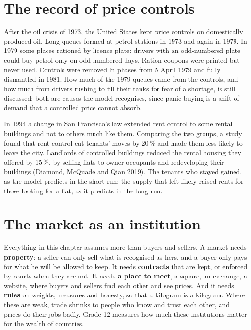 \section{The record of price controls}\label{sec:g10:what-prices-do:record}

\begin{record}
After the oil crisis of 1973, the United States kept price controls on domestically produced oil. Long queues formed at petrol stations in 1973 and again in 1979.
In 1979 some places rationed by licence plate: drivers with an odd-numbered plate could buy petrol only on odd-numbered days. Ration coupons were printed but never
used. Controls were removed in phases from 5 April 1979 and fully dismantled in 1981. How much of the 1979 queues came from the controls, and how much from drivers
rushing to fill their tanks for fear of a shortage, is still discussed; both are causes the model recognises, since panic buying is a shift of demand that a
controlled price cannot absorb.
\end{record}

\begin{record}[Rent control in San Francisco]
In 1994 a change in San Francisco's law extended rent control to some rental buildings and not to others much like them. Comparing the two groups, a study
found that rent control cut tenants' moves by 20\,\% and made them less likely to leave the city. Landlords of controlled buildings reduced the rental
housing they offered by 15\,\%, by selling flats to owner-occupants and redeveloping their buildings (Diamond, McQuade and Qian 2019). The tenants who stayed gained,
as the model predicts in the short run; the supply that left likely raised rents for those looking for a flat, as it predicts in the long run.
\end{record}

\section{The market as an institution}\label{sec:g10:what-prices-do:institution}

Everything in this chapter assumes more than buyers and sellers. A market needs \textbf{property}: a seller can only sell what is recognised as hers, and a buyer
only pays for what he will be allowed to keep. It needs \textbf{contracts} that are kept, or enforced by courts when they are not. It needs \textbf{a place to meet},
a square, an exchange, a website, where buyers and sellers find each other and see prices. And it needs \textbf{rules} on weights, measures and honesty, so that a
kilogram is a kilogram. Where these are weak, trade shrinks to people who know and trust each other, and prices do their jobs badly. Grade 12 measures how much
these institutions matter for the wealth of countries.

